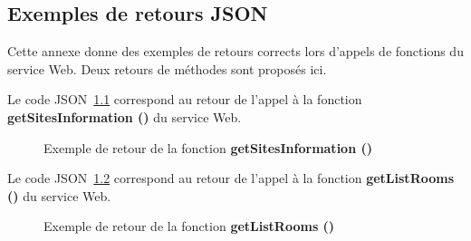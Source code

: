 \begin{appendices}
\chapter{Exemples de retours JSON}
\label{chapterAnnexe:exempleJSON}

Cette annexe donne des exemples de retours corrects lors d'appels de fonctions du service Web.
Deux retours de m\'ethodes sont propos\'es ici.

Le code JSON~\ref{annexe:getsitesinformation} correspond au retour de l'appel \`a la fonction \textbf{getSitesInformation ()} du service Web.

\begin{figure}[!ht]
	\centering
	
	\caption{Exemple de retour de la fonction \textbf{getSitesInformation ()}}
	\label{annexe:getsitesinformation}

\end{figure}

\clearpage

Le code JSON~\ref{annexe:getlistrooms} correspond au retour de l'appel \`a la fonction \textbf{getListRooms ()} du service Web.

\begin{figure}[!ht]
	\centering
	
	\caption{Exemple de retour de  la fonction \textbf{getListRooms ()}}
	\label{annexe:getlistrooms}

\end{figure}

\end{appendices}

\clearpage
